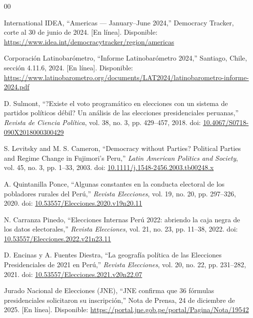 \documentclass[conference,10pt,letterpaper]{IEEEtran}
\begin{document}
\balance
\begin{thebibliography}{00}
\footnotesize
\setlength{\itemsep}{1.2pt plus 0.4pt minus 0.4pt}
\setlength{\parskip}{0pt}

 International IDEA, ``Americas --- January--June 2024,'' Democracy Tracker, corte al 30 de junio de 2024. [En línea]. Disponible: \url{https://www.idea.int/democracytracker/region/americas}

 Corporación Latinobarómetro, ``Informe Latinobarómetro 2024,'' Santiago, Chile, sección 4.11.6, 2024. [En línea]. Disponible: \url{https://www.latinobarometro.org/documents/LAT2024/latinobarometro-informe-2024.pdf}

 D. Sulmont, ``?Existe el voto programático en elecciones con un sistema de partidos políticos débil? Un análisis de las elecciones presidenciales peruanas,'' \textit{Revista de Ciencia Política}, vol. 38, no. 3, pp. 429--457, 2018. doi: \href{https://doi.org/10.4067/S0718-090X2018000300429}{10.4067/S0718-090X2018000300429}

 S. Levitsky and M. S. Cameron, ``Democracy without Parties? Political Parties and Regime Change in Fujimori's Peru,'' \textit{Latin American Politics and Society}, vol. 45, no. 3, pp. 1--33, 2003. doi: \href{https://doi.org/10.1111/j.1548-2456.2003.tb00248.x}{10.1111/j.1548-2456.2003.tb00248.x}

 A. Quintanilla Ponce, ``Algunas constantes en la conducta electoral de los pobladores rurales del Perú,'' \textit{Revista Elecciones}, vol. 19, no. 20, pp. 297--326, 2020. doi: \href{https://doi.org/10.53557/Elecciones.2020.v19n20.11}{10.53557/Elecciones.2020.v19n20.11}

 N. Carranza Pinedo, ``Elecciones Internas Perú 2022: abriendo la caja negra de los datos electorales,'' \textit{Revista Elecciones}, vol. 21, no. 23, pp. 11--38, 2022. doi: \href{https://doi.org/10.53557/Elecciones.2022.v21n23.11}{10.53557/Elecciones.2022.v21n23.11}

 D. Encinas y A. Fuentes Diestra, ``La geografía política de las Elecciones Presidenciales de 2021 en Perú,'' \textit{Revista Elecciones}, vol. 20, no. 22, pp. 231--282, 2021. doi: \href{https://doi.org/10.53557/Elecciones.2021.v20n22.07}{10.53557/Elecciones.2021.v20n22.07}

 Jurado Nacional de Elecciones (JNE), ``JNE confirma que 36 fórmulas presidenciales solicitaron su inscripción,'' Nota de Prensa, 24 de diciembre de 2025. [En línea]. Disponible: \url{https://portal.jne.gob.pe/portal/Pagina/Nota/19542}


\end{thebibliography}
\end{document}
